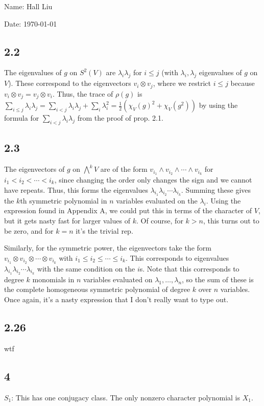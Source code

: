 \documentclass{article}
\begin{document}
Name: Hall Liu

Date: \today 
\vspace{1.5cm}
\subsection*{2.2}
The eigenvalues of $g$ on $S^2(V)$ are $\lambda_i\lambda_j$ for $i\leq j$ (with $\lambda_i,\lambda_j$ eigenvalues of $g$ on $V$). These correspond to the eigenvectors $v_i\otimes v_j$, where we restrict $i\leq j$ because $v_i\otimes v_j=v_j\otimes v_i$. Thus, the trace of $\rho(g)$ is $\sum_{i\leq j}\lambda_i\lambda_j=\sum_{i<j}\lambda_i\lambda_j+\sum_i\lambda_i^2=\frac{1}{2}(\chi_V(g)^2+\chi_V(g^2))$ by using the formula for $\sum_{i<j}\lambda_i\lambda_j$ from the proof of prop. 2.1.
\subsection*{2.3}
The eigenvectors of $g$ on $\bigwedge^kV$ are of the form $v_{i_1}\wedge v_{i_2}\wedge\cdots\wedge v_{i_k}$ for $i_1<i_2<\cdots<i_k$, since changing the order only changes the sign and we cannot have repeats. Thus, this forms the eigenvalues $\lambda_{i_1}\lambda_{i_2}\cdots\lambda_{i_k}$. Summing these gives the $k$th symmetric polynomial in $n$ variables evaluated on the $\lambda_i$. Using the expression found in Appendix A, we could put this in terms of the character of $V$, but it gets nasty fast for larger values of $k$. Of course, for $k>n$, this turns out to be zero, and for $k=n$ it's the trivial rep.

Similarly, for the symmetric power, the eigenvectors take the form $v_{i_1}\otimes v_{i_2}\otimes\cdots\otimes v_{i_k}$ with $i_1\leq i_2\leq\cdots\leq i_k$. This corresponds to eigenvalues $\lambda_{i_1}\lambda_{i_2}\cdots\lambda_{i_k}$ with the same condition on the $i$s. Note that this corresponds to degree $k$ monomials in $n$ variables evaluated on $\lambda_1,\ldots,\lambda_n$, so the sum of these is the complete homogeneous symmetric polynomial of degree $k$ over $n$ variables. Once again, it's a nasty expression that I don't really want to type out.
\subsection*{2.26}
wtf
\subsection*{4}
$S_1$: This has one conjugacy class. The only nonzero character polynomial is $X_1$.
\end{document}
